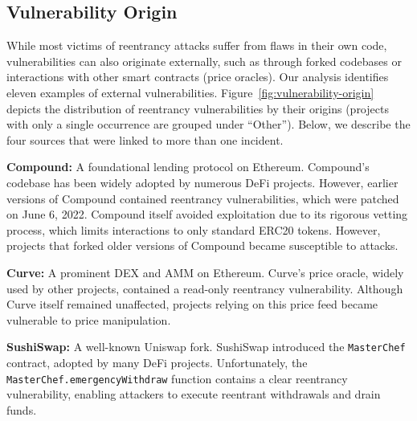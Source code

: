 

\subsection{Vulnerability Origin}
\label{quantitative:vulnerability-origin}

While most victims of reentrancy attacks suffer from flaws in their own code, vulnerabilities can also originate externally, such as through forked codebases or interactions with other smart contracts (\eg price oracles). Our analysis identifies eleven examples of external vulnerabilities. Figure~\ref{fig:vulnerability-origin} depicts the distribution of reentrancy vulnerabilities by their origins (projects with only a single occurrence are grouped under ``Other''). Below, we describe the four sources that were linked to more than one incident.

\textbf{Compound:} \label{compound} A foundational lending protocol on Ethereum. Compound's codebase has been widely adopted by numerous DeFi projects. However, earlier versions of Compound contained reentrancy vulnerabilities, which were patched on June 6, 2022. Compound itself avoided exploitation due to its rigorous vetting process, which limits interactions to only standard ERC20 tokens. However, projects that forked older versions of Compound became susceptible to attacks.

\textbf{Curve:} A prominent DEX and AMM on Ethereum. Curve's price oracle, widely used by other projects, contained a read-only reentrancy vulnerability. Although Curve itself remained unaffected, projects relying on this price feed became vulnerable to price manipulation.

\textbf{SushiSwap:} A well-known Uniswap fork. SushiSwap introduced the \lstinline{MasterChef} contract, adopted by many DeFi projects. Unfortunately, the \lstinline{MasterChef.emergencyWithdraw} function contains a clear reentrancy vulnerability, enabling attackers to execute reentrant withdrawals and drain funds.

